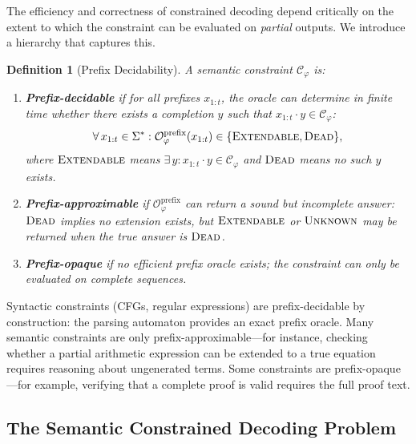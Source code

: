 \documentclass[twoside,11pt]{article}
\newtheorem{definition}[theorem]{Definition}
\newcommand{\Vocab}{\Sigma}
\newcommand{\Oracle}{\mathcal{O}}
\newcommand{\Constraint}{\mathcal{C}}
\begin{document}
The efficiency and correctness of constrained decoding depend critically on
the extent to which the constraint can be evaluated on \emph{partial}
outputs. We introduce a hierarchy that captures this.

\begin{definition}[Prefix Decidability]
\label{def:prefix-decidability}
A semantic constraint $\Constraint_\varphi$ is:
\begin{enumerate}
    \item \textbf{Prefix-decidable} if for all prefixes $x_{1:t}$, the
    oracle can determine in finite time whether there exists a completion
    $y$ such that $x_{1:t} \cdot y \in \Constraint_\varphi$:
    \begin{equation}
    \label{eq:prefix-decidable}
    \forall\, x_{1:t} \in \Vocab^* : \Oracle_\varphi^{\mathrm{prefix}}(x_{1:t})
    \in \{\textsc{Extendable}, \textsc{Dead}\},
    \end{equation}
    where $\textsc{Extendable}$ means $\exists\, y : x_{1:t} \cdot y \in
    \Constraint_\varphi$ and $\textsc{Dead}$ means no such $y$ exists.

    \item \textbf{Prefix-approximable} if $\Oracle_\varphi^{\mathrm{prefix}}$
    can return a sound but incomplete answer: $\textsc{Dead}$ implies no
    extension exists, but $\textsc{Extendable}$ or $\textsc{Unknown}$ may
    be returned when the true answer is $\textsc{Dead}$.

    \item \textbf{Prefix-opaque} if no efficient prefix oracle exists; the
    constraint can only be evaluated on complete sequences.
\end{enumerate}
\end{definition}

Syntactic constraints (CFGs, regular expressions) are prefix-decidable by
construction: the parsing automaton provides an exact prefix oracle. Many
semantic constraints are only prefix-approximable---for instance, checking
whether a partial arithmetic expression can be extended to a true equation
requires reasoning about ungenerated terms. Some constraints are
prefix-opaque---for example, verifying that a complete proof is valid
requires the full proof text.

\subsection{The Semantic Constrained Decoding Problem}
\label{sec:scd-problem}
\end{document}
